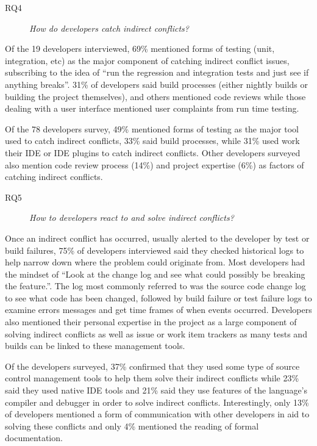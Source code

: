 \documentclass[conference]{IEEEtran}
\begin{document}

\begin{description}
	\item[RQ4] \textit{How do developers catch indirect conflicts?}
\end{description}

Of the 19 developers interviewed, 69\% mentioned forms of testing (unit, integration, etc) as the major component of catching indirect
conflict issues, subscribing to the idea of ``run the regression and integration tests and just see if anything breaks''. 31\% of developers 
said build processes (either nightly builds or building the project themselves), and others mentioned code reviews
while those dealing with a user interface mentioned user complaints from run time testing.

Of the 78 developers survey, 49\% mentioned forms of testing as the major tool used to catch indirect conflicts, 33\% said build processes,
while 31\% used work their IDE or IDE plugins to catch indirect conflicts. Other developers surveyed also mention code review process (14\%)
and project expertise (6\%) as factors of catching indirect conflicts.

\begin{description}
	\item[RQ5] \textit{How to developers react to and solve indirect conflicts?}
\end{description}

Once an indirect conflict has occurred, usually alerted to the developer by test or build failures, 75\% of developers interviewed said
they checked historical logs to help narrow down where the problem could originate from. Most developers had the mindset of
``Look at the change log and see what could possibly be breaking the feature.''. The log most commonly referred to was the source
code change log to see what code has been changed, followed by build failure or test failure logs to examine errors messages and get time 
frames of when events occurred. Developers also mentioned their personal expertise in the project as a large component of solving indirect
conflicts as well as issue or work item trackers as many tests and builds can be linked to these management tools.

Of the developers surveyed, 37\% confirmed that they used some type of source control management tools to help them solve their indirect
conflicts while 23\% said they used native IDE tools and 21\% said they use features of the language's compiler and debugger in order
to solve indirect conflicts. Interestingly, only 13\% of developers mentioned a form of communication with other developers in aid to
solving these conflicts and only 4\% mentioned the reading of formal documentation.
\end{document}
